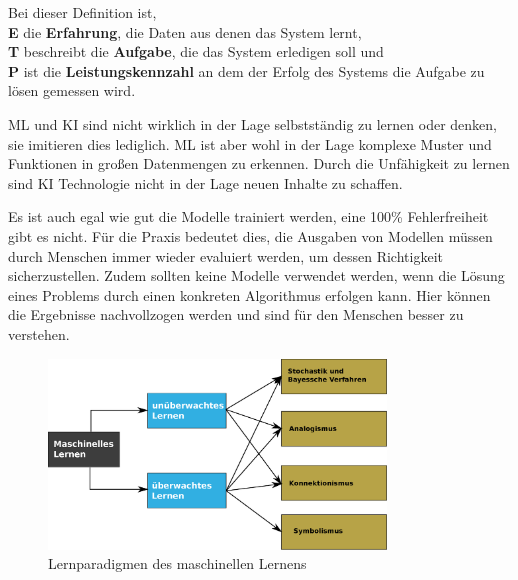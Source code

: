 Bei dieser Definition ist,\\
\textbf{E} die \textbf{Erfahrung}, die Daten aus denen das System lernt,\\
\textbf{T} beschreibt die \textbf{Aufgabe}, die das System erledigen soll und\\
\textbf{P} ist die \textbf{Leistungskennzahl} an dem der Erfolg des Systems die Aufgabe zu lösen gemessen wird.\vspace{0.2cm}

\acrshort{ML} und \acrshort{KI} sind nicht wirklich in der Lage selbstständig zu lernen oder denken, sie imitieren dies lediglich. \acrshort{ML} ist aber wohl in der Lage komplexe Muster und Funktionen in großen Datenmengen zu erkennen. Durch die Unfähigkeit zu lernen sind KI Technologie nicht in der Lage neuen Inhalte zu schaffen.\vspace{0.2cm}

Es ist auch egal wie gut die Modelle trainiert werden, eine 100\% Fehlerfreiheit gibt es nicht. Für die Praxis bedeutet dies, die Ausgaben von Modellen müssen durch Menschen immer wieder evaluiert werden, um dessen Richtigkeit sicherzustellen. Zudem sollten keine Modelle verwendet werden, wenn die Lösung eines Problems durch einen konkreten Algorithmus erfolgen kann. Hier können die Ergebnisse nachvollzogen werden und sind für den Menschen besser zu verstehen.\vspace{0.2cm}

\begin{figure}[!ht]
	\includegraphics[width=0.8\textwidth]{content/chapter_basics/images/learning_paradigmen_ml_v2.eps}
	\centering
	\caption{Lernparadigmen des maschinellen Lernens}
	\label{img:learning_paradigms_of_ml}
\end{figure}


